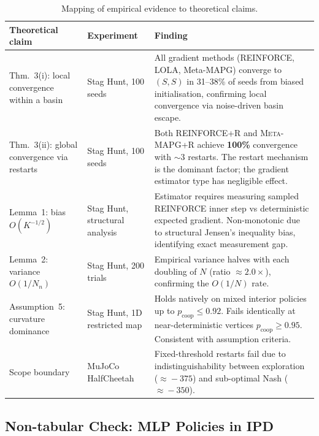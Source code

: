 \documentclass[11pt,a4paper]{article}
\newcommand{\OUR}{\textsc{Meta-MAPG+R}}
\theoremstyle{remark}
\begin{document}
\begin{table}[H]
  \centering
  \caption{%
    Mapping of empirical evidence to theoretical claims.
  }
  \label{tab:mapping}
  \setlength{\tabcolsep}{5pt}
  \begin{tabular}{>{\small}p{3.3cm} >{\small}p{3.8cm} >{\small}p{5.8cm}}
    \toprule
    \textbf{Theoretical claim} & \textbf{Experiment} & \textbf{Finding} \\
    \midrule
    Thm.~3(i): local convergence within a basin &
    Stag Hunt, 100 seeds &
    All gradient methods (REINFORCE, LOLA, Meta-MAPG) converge to
    $(S,S)$ in 31--38\% of seeds from biased initialisation,
    confirming local convergence via noise-driven basin escape. \\[4pt]
    Thm.~3(ii): global convergence via restarts &
    Stag Hunt, 100 seeds &
    Both REINFORCE+R and \OUR{} achieve \textbf{100\%}
    convergence with $\sim$3 restarts.
    The restart mechanism is the dominant factor;
    the gradient estimator type has negligible effect. \\[4pt]
    Lemma~1: bias $O(K^{-1/2})$ &
    Stag Hunt, structural analysis &
    Estimator requires measuring sampled REINFORCE inner step vs deterministic expected gradient. Non-monotonic due to structural Jensen's inequality bias, identifying exact measurement gap. \\[4pt]
    Lemma~2: variance $O(1/N_n)$ &
    Stag Hunt, 200 trials &
    Empirical variance halves with each doubling of $N$
    (ratio $\approx 2.0\times$), confirming the $O(1/N)$ rate. \\[4pt]
    Assumption~5: curvature dominance &
    Stag Hunt, 1D restricted map &
    Holds natively on mixed interior policies up to $p_{\mathrm{coop}} \le 0.92$.
    Fails identically at near-deterministic vertices $p_{\mathrm{coop}} \ge 0.95$.
    Consistent with assumption criteria. \\[4pt]
    Scope boundary &
    MuJoCo HalfCheetah &
    Fixed-threshold restarts fail due to indistinguishability
    between exploration ($\approx\!-375$) and sub-optimal Nash ($\approx\!-350$). \\
    \bottomrule
  \end{tabular}
\end{table}

\subsection{Non-tabular Check: MLP Policies in IPD}
\label{sec:mlp_check}
\end{document}
